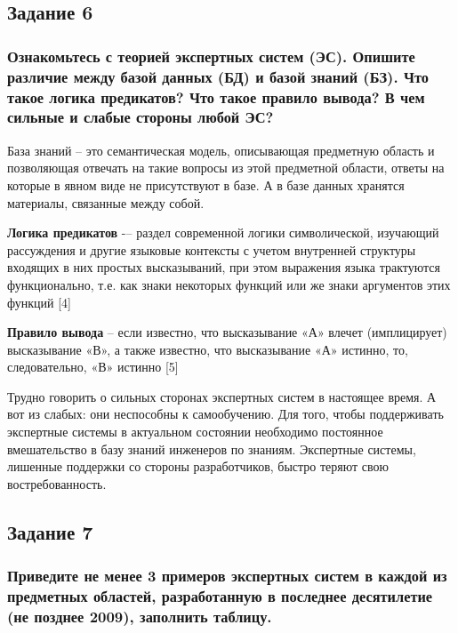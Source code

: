 \documentclass[14pt,a4paper,report]{report}
\begin{document}
\subsection{Задание 6}

\subsubsection{Ознакомьтесь с теорией экспертных систем (ЭС). Опишите различие между базой данных (БД) и базой знаний (БЗ). Что такое логика предикатов? Что такое правило вывода? В чем сильные и слабые стороны любой ЭС?}

База знаний -- это семантическая модель, описывающая предметную область и позволяющая отвечать на такие вопросы из этой предметной области, ответы на которые в явном виде не присутствуют в базе. А в базе данных хранятся материалы, связанные между собой. 

\textbf{Логика предикатов} -– раздел современной логики символической, изучающий рассуждения и другие языковые контексты с учетом внутренней структуры входящих в них простых высказываний, при этом выражения языка трактуются функционально, т.е. как знаки некоторых функций или же знаки аргументов этих функций [4]

\textbf{Правило вывода} -- если известно, что высказывание «А» влечет (имплицирует) высказывание «В», а также известно, что высказывание «А» истинно, то, следовательно, «В» истинно [5]

Трудно говорить о сильных сторонах экспертных систем в настоящее время. А вот из слабых: они неспособны к самообучению. Для того, чтобы поддерживать экспертные системы в актуальном состоянии необходимо постоянное вмешательство в базу знаний инженеров по знаниям. Экспертные системы, лишенные поддержки со стороны разработчиков, быстро теряют свою востребованность.


\clearpage

\subsection{Задание 7}

\subsubsection{Приведите не менее 3 примеров экспертных систем в каждой из предметных областей, разработанную в последнее десятилетие (не позднее 2009), заполнить таблицу.}
\end{document}
